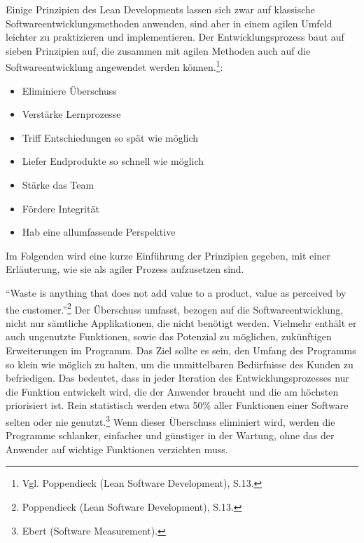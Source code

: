              Einige Prinzipien des Lean Developments lassen sich zwar auf klassische Softwareentwicklungsmethoden anwenden, sind aber in einem agilen Umfeld leichter zu praktizieren und implementieren. Der Entwicklungsprozess baut auf sieben Prinzipien auf, die zusammen mit agilen Methoden auch auf die Softwareentwicklung angewendet werden können.\footnote{Vgl. Poppendieck (Lean Software Development), S.13.}:

            \begin{itemize}
                \item Eliminiere Überschuss
                \item Verstärke Lernprozesse
                \item Triff Entschiedungen so spät wie möglich
                \item Liefer Endprodukte so schnell wie möglich
                \item Stärke das Team
                \item Fördere Integrität
                \item Hab eine allumfassende Perspektive
            \end{itemize}

            Im Folgenden wird eine kurze Einführung der Prinzipien gegeben, mit einer Erläuterung, wie sie als agiler Prozess aufzusetzen sind.

            \enquote{Waste is anything that does not add value to a product, value as perceived by the customer.}\footnote{Poppendieck (Lean Software Development), S.13.} Der Überschuss umfasst, bezogen auf die Softwareentwicklung, nicht nur sämtliche Applikationen, die nicht benötigt werden. Vielmehr enthält er auch ungenutzte Funktionen, sowie das Potenzial zu möglichen, zukünftigen Erweiterungen im Programm. Das Ziel sollte es sein, den Umfang des Programms so klein wie möglich zu halten, um die unmittelbaren Bedürfnisse des Kunden zu befriedigen. Das bedeutet, dass in jeder Iteration des Entwicklungsprozesses nur die Funktion entwickelt wird, die der Anwender braucht und die am höchsten priorisiert ist. Rein statistisch werden etwa 50\% aller Funktionen einer Software selten oder nie genutzt.\footnote{Ebert (Software Measurement).} Wenn dieser Überschuss eliminiert wird, werden die Programme schlanker, einfacher und günstiger in der Wartung, ohne das der Anwender auf wichtige Funktionen verzichten muss.

